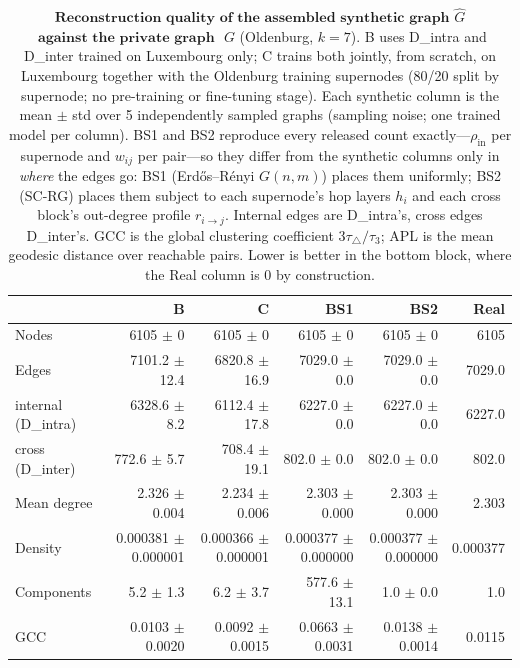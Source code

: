 \begin{table}[H]
\centering
\caption{$\textbf{Reconstruction quality of the assembled synthetic graph}$
$\widehat{G}$ $\textbf{ against the private graph }$ $G$ (Oldenburg, $k{=}7$).
B uses D\_intra and D\_inter trained on Luxembourg only; C trains both jointly, from
scratch, on Luxembourg together with the Oldenburg training supernodes (80/20 split
by supernode; no pre-training or fine-tuning stage). Each synthetic column is the
mean $\pm$ std over 5 independently sampled graphs (sampling noise; one trained
model per column). BS1 and BS2 reproduce every released count exactly---$\rho_{\mathrm{in}}$
per supernode and $w_{ij}$ per pair---so they differ from the synthetic columns
only in \emph{where} the edges go: BS1 (Erd\H{o}s--R\'enyi $G(n,m)$) places them
uniformly; BS2 (SC-RG) places them subject to each supernode's hop layers $h_i$ and
each cross block's out-degree profile $r_{i\to j}$. Internal edges are D\_intra's, cross edges
D\_inter's. GCC is the global clustering coefficient $3\tau_{\triangle}/\tau_{3}$;
APL is the mean geodesic distance over reachable pairs. Lower is better in the
bottom block, where the Real column is $0$ by construction.}
\label{tab:lsyn-oldenburg-k7}
\begin{tabular}{lrrrrr}
\toprule
 & B & C & BS1 & BS2 & Real \\
\midrule
Nodes                         & 6105 $\pm$ 0 & 6105 $\pm$ 0 & 6105 $\pm$ 0 & 6105 $\pm$ 0 & 6105 \\
Edges                         & 7101.2 $\pm$ 12.4 & 6820.8 $\pm$ 16.9 & 7029.0 $\pm$ 0.0 & 7029.0 $\pm$ 0.0 & 7029.0 \\
\quad internal (D\_intra)     & 6328.6 $\pm$ 8.2 & 6112.4 $\pm$ 17.8 & 6227.0 $\pm$ 0.0 & 6227.0 $\pm$ 0.0 & 6227.0 \\
\quad cross (D\_inter)        & 772.6 $\pm$ 5.7 & 708.4 $\pm$ 19.1 & 802.0 $\pm$ 0.0 & 802.0 $\pm$ 0.0 & 802.0 \\
Mean degree                   & 2.326 $\pm$ 0.004 & 2.234 $\pm$ 0.006 & 2.303 $\pm$ 0.000 & 2.303 $\pm$ 0.000 & 2.303 \\
Density                       & 0.000381 $\pm$ 0.000001 & 0.000366 $\pm$ 0.000001 & 0.000377 $\pm$ 0.000000 & 0.000377 $\pm$ 0.000000 & 0.000377 \\
Components                    & 5.2 $\pm$ 1.3 & 6.2 $\pm$ 3.7 & 577.6 $\pm$ 13.1 & 1.0 $\pm$ 0.0 & 1.0 \\
GCC                           & 0.0103 $\pm$ 0.0020 & 0.0092 $\pm$ 0.0015 & 0.0663 $\pm$ 0.0031 & 0.0138 $\pm$ 0.0014 & 0.0115 \\

\end{tabular}
\end{table}
